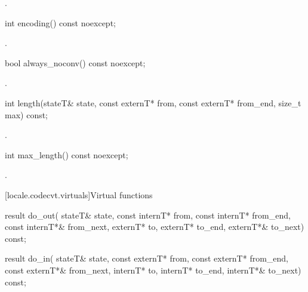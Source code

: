 \begin{itemdescr}
\pnum
\returns
{}.
\end{itemdescr}

%
\begin{itemdecl}
int encoding() const noexcept;
\end{itemdecl}

\begin{itemdescr}
\pnum
\returns
{}.
\end{itemdescr}

%
\begin{itemdecl}
bool always_noconv() const noexcept;
\end{itemdecl}

\begin{itemdescr}
\pnum
\returns
{}.
\end{itemdescr}

%
\begin{itemdecl}
int length(stateT& state, const externT* from, const externT* from_end, size_t max) const;
\end{itemdecl}

\begin{itemdescr}
\pnum
\returns
{}.
\end{itemdescr}

%
\begin{itemdecl}
int max_length() const noexcept;
\end{itemdecl}

\begin{itemdescr}
\pnum
\returns
{}.
\end{itemdescr}

[locale.codecvt.virtuals]{Virtual functions}

%
%
\begin{itemdecl}
result do_out(
  stateT& state,
  const internT* from, const internT* from_end, const internT*& from_next,
  externT* to, externT* to_end, externT*& to_next) const;

result do_in(
  stateT& state,
  const externT* from, const externT* from_end, const externT*& from_next,
  internT* to, internT* to_end, internT*& to_next) const;
\end{itemdecl}


